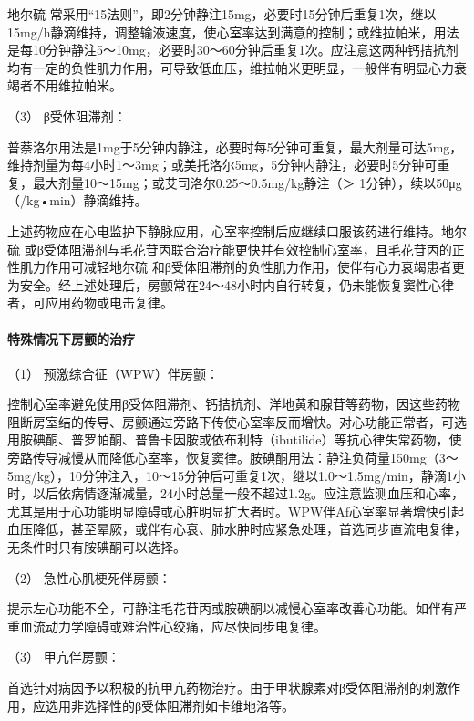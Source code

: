 地尔硫{}
常采用“15法则”，即2分钟静注15mg，必要时15分钟后重复1次，继以15mg/h静滴维持，调整输液速度，使心室率达到满意的控制；或维拉帕米，用法是每10分钟静注5～10mg，必要时30～60分钟后重复1次。应注意这两种钙拮抗剂均有一定的负性肌力作用，可导致低血压，维拉帕米更明显，一般伴有明显心力衰竭者不用维拉帕米。

\hypertarget{text00291.htmlux5cux23CHP10-2-4-3-1-1-2-3}{}
（3） β受体阻滞剂：

普萘洛尔用法是1mg于5分钟内静注，必要时每5分钟可重复，最大剂量可达5mg，维持剂量为每4小时1～3mg；或美托洛尔5mg，5分钟内静注，必要时5分钟可重复，最大剂量10～15mg；或艾司洛尔0.25～0.5mg/kg静注（＞
1分钟），续以50μg（/kg•min）静滴维持。

上述药物应在心电监护下静脉应用，心室率控制后应继续口服该药进行维持。地尔硫{}
或β受体阻滞剂与毛花苷丙联合治疗能更快并有效控制心室率，且毛花苷丙的正性肌力作用可减轻地尔硫{}
和β受体阻滞剂的负性肌力作用，使伴有心力衰竭患者更为安全。经上述处理后，房颤常在24～48小时内自行转复，仍未能恢复窦性心律者，可应用药物或电击复律。

\paragraph{特殊情况下房颤的治疗}

\hypertarget{text00291.htmlux5cux23CHP10-2-4-3-1-1-3-1}{}
（1） 预激综合征（WPW）伴房颤：

控制心室率避免使用β受体阻滞剂、钙拮抗剂、洋地黄和腺苷等药物，因这些药物阻断房室结的传导、房颤通过旁路下传使心室率反而增快。对心功能正常者，可选用胺碘酮、普罗帕酮、普鲁卡因胺或依布利特（ibutilide）等抗心律失常药物，使旁路传导减慢从而降低心室率，恢复窦律。胺碘酮用法：静注负荷量150mg（3～5mg/kg），10分钟注入，10～15分钟后可重复1次，继以1.0～1.5mg/min，静滴1小时，以后依病情逐渐减量，24小时总量一般不超过1.2g。应注意监测血压和心率，尤其是用于心功能明显障碍或心脏明显扩大者时。WPW伴Af心室率显著增快引起血压降低，甚至晕厥，或伴有心衰、肺水肿时应紧急处理，首选同步直流电复律，无条件时只有胺碘酮可以选择。

\hypertarget{text00291.htmlux5cux23CHP10-2-4-3-1-1-3-2}{}
（2） 急性心肌梗死伴房颤：

提示左心功能不全，可静注毛花苷丙或胺碘酮以减慢心室率改善心功能。如伴有严重血流动力学障碍或难治性心绞痛，应尽快同步电复律。

\hypertarget{text00291.htmlux5cux23CHP10-2-4-3-1-1-3-3}{}
（3） 甲亢伴房颤：

首选针对病因予以积极的抗甲亢药物治疗。由于甲状腺素对β受体阻滞剂的刺激作用，应选用非选择性的β受体阻滞剂如卡维地洛等。

